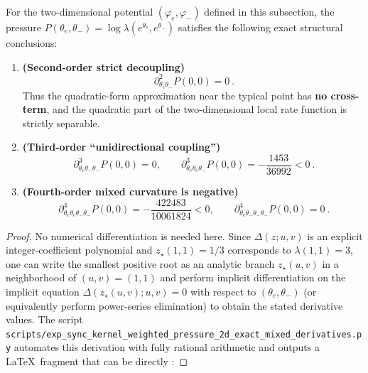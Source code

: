 \begin{proposition}\label{prop:sync-kernel-2d-exact-decouple}
For the two-dimensional potential \((\varphi_e,\varphi_-)\) defined in this subsection, the pressure
\(
P(\theta_e,\theta_-)=\log\lambda(e^{\theta_e},e^{\theta_-})
\)
satisfies the following exact structural conclusions:
\begin{enumerate}
  \item \textbf{(Second-order strict decoupling)}
  \[
  \boxed{\ \partial^2_{\theta_e\theta_-}P(0,0)=0\ }.
  \]
  Thus the quadratic-form approximation near the typical point has \textbf{no cross-term}, and the quadratic part of the two-dimensional local rate function is strictly separable.
  \item \textbf{(Third-order ``unidirectional coupling'')}
  \[
  \boxed{\ \partial^3_{\theta_e\theta_-\theta_-}P(0,0)=0,\qquad
  \partial^3_{\theta_e\theta_e\theta_-}P(0,0)=-\frac{1453}{36992}<0\ }.
  \]
  \item \textbf{(Fourth-order mixed curvature is negative)}
  \[
  \boxed{\ \partial^4_{\theta_e\theta_e\theta_-\theta_-}P(0,0)=-\frac{422483}{10061824}<0,\qquad
  \partial^4_{\theta_e\theta_-\theta_-\theta_-}P(0,0)=0\ }.
  \]
\end{enumerate}
\end{proposition}

\begin{proof}
No numerical differentiation is needed here. Since \(\Delta(z;u,v)\) is an explicit integer-coefficient polynomial and
\(
z_\star(1,1)=1/3
\)
corresponds to \(\lambda(1,1)=3\), one can write the smallest positive root as an analytic branch
\(
z_\star(u,v)
\)
in a neighborhood of \((u,v)=(1,1)\) and perform implicit differentiation on the implicit equation \(\Delta(z_\star(u,v);u,v)=0\) with respect to \((\theta_e,\theta_-)\) (or equivalently perform power-series elimination) to obtain the stated derivative values.
The script \texttt{scripts/exp\_sync\_kernel\_weighted\_pressure\_2d\_exact\_mixed\_derivatives.py} automates this derivation with fully rational arithmetic and outputs a \LaTeX\ fragment that can be directly \verb||:

\qedhere
\end{proof}

